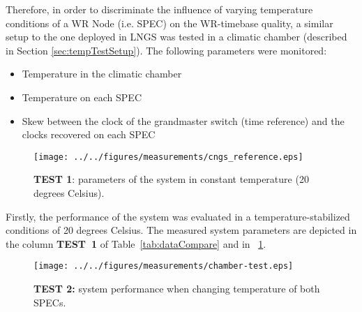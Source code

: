 Therefore, in order to discriminate the influence of varying temperature conditions of a 
WR Node (i.e. SPEC) on the WR-timebase quality, a similar setup to the one 
deployed in LNGS was tested in a climatic chamber (described in Section \ref{sec:tempTestSetup}). 
The following parameters were monitored:
\begin{itemize}
  \item Temperature in the climatic chamber
  \item Temperature on each SPEC
  \item Skew between the clock of the grandmaster switch (time reference) and the clocks recovered 
        on each SPEC
\end{itemize}

\begin{figure}[!t]
\centering
\texttt{[image: ../../figures/measurements/cngs\_reference.eps]}
\caption{\textbf{TEST 1}: parameters of the system in constant temperature (20 degrees Celsius).}
\label{fig:chamber-ref}
\end{figure}
% 

Firstly, the performance of the system was evaluated in a temperature-stabilized conditions of 
20 degrees Celsius. The measured 
system parameters are depicted in the column \textbf{TEST~1} of Table~\ref{tab:dataCompare} and in 
\figurename~\ref{fig:chamber-ref}.


\begin{figure}[!t]
\centering
\texttt{[image: ../../figures/measurements/chamber-test.eps]}
\caption{\textbf{TEST 2:} system performance when changing temperature of both SPECs.}
\label{fig:chamber-test}
\end{figure}


